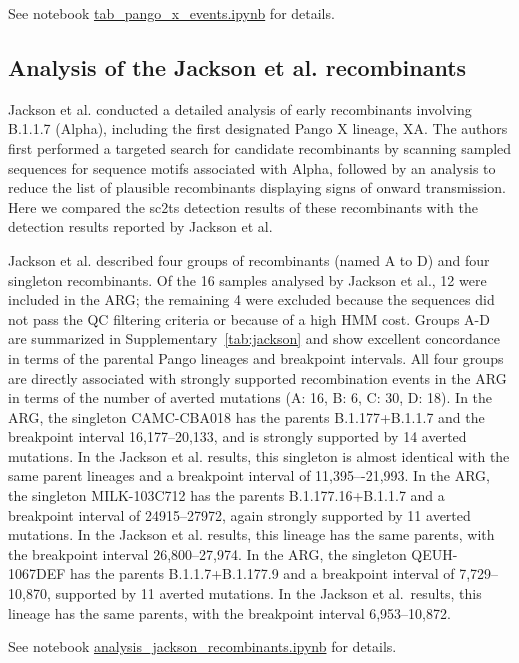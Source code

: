 \documentclass[12pt]{article}
\newcommand{\siref}[1]{Supplementary~\ref{#1}}
\begin{document}
See notebook
\href{https://github.com/jeromekelleher/sc2ts-paper/blob/main/notebooks/tab\_pango\_x\_events.ipynb}
{tab\_pango\_x\_events.ipynb} for details.

\subsection{Analysis of the Jackson et al. recombinants}
\label{sec:jackson_recombs}

Jackson et al.\cite{Jackson2021} conducted a detailed analysis of
early recombinants involving B.1.1.7 (Alpha),
including the first designated Pango X lineage, XA.
The authors first performed a targeted search for candidate recombinants by
scanning sampled sequences for sequence motifs associated with Alpha,
followed by an analysis to reduce the list of plausible recombinants
displaying signs of onward transmission.
Here we compared the sc2ts detection results of these recombinants
with the detection results reported by Jackson et al.

Jackson et al. described
four groups of recombinants (named A to D) and four singleton recombinants.
Of the 16 samples analysed by Jackson et al., 12 were included in the ARG;
the remaining 4 were excluded
because the sequences did not pass the QC filtering criteria or
because of a high HMM cost.
Groups A-D are summarized in \siref{tab:jackson} and
show excellent concordance
in terms of the parental Pango lineages and breakpoint intervals.
All four groups are directly associated with
strongly supported recombination events in the ARG
in terms of the number of averted mutations (A: 16, B: 6, C: 30, D: 18).
In the ARG, the singleton CAMC-CBA018 has
the parents B.1.177+B.1.1.7 and
the breakpoint interval 16,177--20,133, and
is strongly supported by 14 averted mutations.
In the Jackson et al. results, this singleton is
almost identical with the same parent lineages and
a breakpoint interval of 11,395–-21,993.
In the ARG, the singleton MILK-103C712 has
the parents B.1.177.16+B.1.1.7 and
a breakpoint interval of 24915--27972,
again strongly supported by 11 averted mutations.
In the Jackson et al. results,
this lineage has the same parents,
with the breakpoint interval 26,800--27,974.
In the ARG, the singleton QEUH-1067DEF has
the parents B.1.1.7+B.1.177.9 and
a breakpoint interval of 7,729--10,870,
supported by 11 averted mutations.
In the Jackson et al.\ results,
this lineage has the same parents,
with the breakpoint interval 6,953--10,872.

See notebook
\href{https://github.com/jeromekelleher/sc2ts-paper/blob/main/notebooks/analysis\_jackson\_recombinants.ipynb}
{analysis\_jackson\_recombinants.ipynb}
for details.
\end{document}
